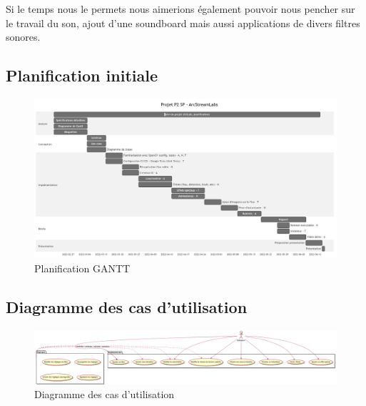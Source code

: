 Si le temps nous le permets nous aimerions également pouvoir nous pencher sur le travail du son, ajout d'une soundboard mais aussi applications de divers filtres sonores.

\newpage

\begin{landscape}

\section{Planification initiale}

\begin{figure}[h]
  \centering
  \includegraphics[width=\textwidth]{./images/gantt.PNG}
  \caption{Planification GANTT}
  \label{gantt}
\end{figure}

\end{landscape}

\newpage

\begin{landscape}

\section{Diagramme des cas d'utilisation}

\begin{figure}[h]
  \centering
  \includegraphics[width=\height]{./images/useCase.png}
  \caption{Diagramme des cas d'utilisation}
  \label{useCase}
\end{figure}

\end{landscape}

